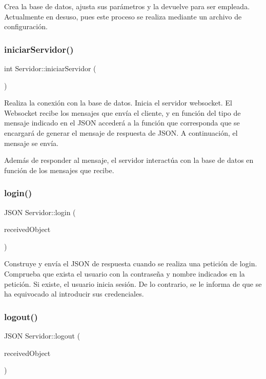 Crea la base de datos, ajusta sus parámetros y la devuelve para ser empleada. Actualmente en desuso, pues este proceso se realiza mediante un archivo de configuración. \mbox{\label{classServidor_a2a7fdca08064f9e567c579a2cb34f267}} 
\subsubsection{\texorpdfstring{iniciar\+Servidor()}{iniciarServidor()}}
{\footnotesize\ttfamily int Servidor\+::iniciar\+Servidor (\begin{DoxyParamCaption}{ }\end{DoxyParamCaption})}

Realiza la conexión con la base de datos. Inicia el servidor websocket. El Websocket recibe los mensajes que envía el cliente, y en función del tipo de mensaje indicado en el J\+S\+ON accederá a la función que corresponda que se encargará de generar el mensaje de respuesta de J\+S\+ON. A continuación, el mensaje se envía.

Además de responder al mensaje, el servidor interactúa con la base de datos en función de los mensajes que recibe. \mbox{\label{classServidor_afa99d1a7d42e43c66c066aa8d4622fbf}} 
\subsubsection{\texorpdfstring{login()}{login()}}
{\footnotesize\ttfamily J\+S\+ON Servidor\+::login (\begin{DoxyParamCaption}\item[{J\+S\+ON}]{received\+Object }\end{DoxyParamCaption})}

Construye y envía el J\+S\+ON de respuesta cuando se realiza una petición de login. Comprueba que exista el usuario con la contraseña y nombre indicados en la petición. Si existe, el usuario inicia sesión. De lo contrario, se le informa de que se ha equivocado al introducir sus credenciales. \mbox{\label{classServidor_a612baa3e7a827632a48aacdc024e2a20}} 
\subsubsection{\texorpdfstring{logout()}{logout()}}
{\footnotesize\ttfamily J\+S\+ON Servidor\+::logout (\begin{DoxyParamCaption}\item[{J\+S\+ON}]{received\+Object }\end{DoxyParamCaption})}

